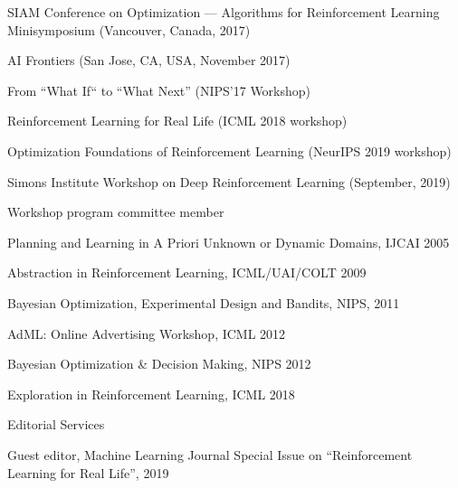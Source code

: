 \documentclass[10pt,twoside,letterpaper]{article}
\newcommand{\negitemspace}{\vspace{1mm}}
\begin{document}
\begin{compactitem}
\begin{compactitem}
\begin{compactitem}
\item{SIAM Conference on Optimization --- Algorithms for Reinforcement Learning Minisymposium (Vancouver, Canada, 2017)}

\item{AI Frontiers (San Jose, CA, USA, November 2017)}

\item{From “What If“ to “What Next” (NIPS’17 Workshop)}

\item{Reinforcement Learning for Real Life (ICML 2018 workshop)}

\item{Optimization Foundations of Reinforcement Learning (NeurIPS 2019 workshop)}

\item{Simons Institute Workshop on Deep Reinforcement Learning (September, 2019)}

\end{compactitem}

\item{Workshop program committee member}

\begin{compactitem}

\item{Planning and Learning in A Priori Unknown or Dynamic Domains, IJCAI 2005}

\item{Abstraction in Reinforcement Learning, ICML/UAI/COLT 2009}

\item{Bayesian Optimization, Experimental Design and Bandits, NIPS, 2011}

\item{AdML: Online Advertising Workshop, ICML 2012}

\item{Bayesian Optimization \& Decision Making, NIPS 2012}

\item{Exploration in Reinforcement Learning, ICML 2018}

\end{compactitem}

\end{compactitem} \negitemspace

\item{Editorial Services} \negitemspace

\begin{compactitem}

\item{Guest editor, Machine Learning Journal Special Issue on ``Reinforcement Learning for Real Life'', 2019}


\end{compactitem}
\end{compactitem}
\end{document}
